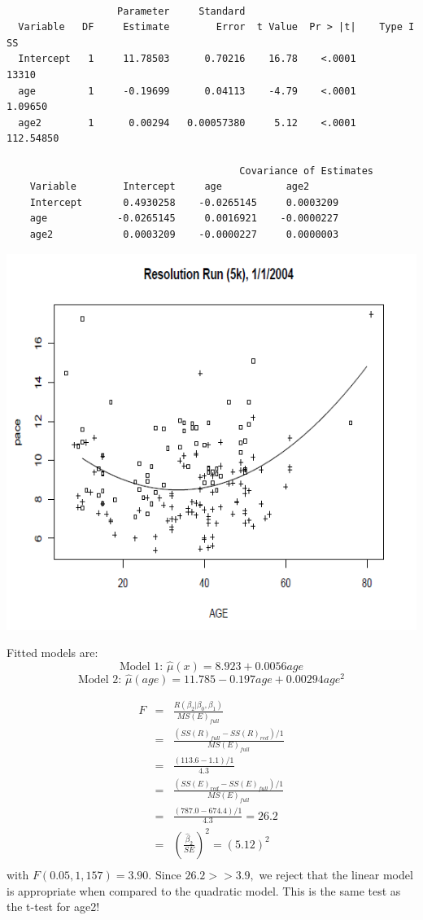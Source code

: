 \newpage

\begin{large}
\begin{verbatim}

                   Parameter     Standard
  Variable   DF     Estimate        Error  t Value  Pr > |t|    Type I SS
  Intercept   1     11.78503      0.70216    16.78    <.0001        13310
  age         1     -0.19699      0.04113    -4.79    <.0001      1.09650
  age2        1      0.00294   0.00057380     5.12    <.0001    112.54850

										Covariance of Estimates 
	Variable        Intercept     age           age2 
	Intercept       0.4930258    -0.0265145     0.0003209 
	age            -0.0265145     0.0016921    -0.0000227 
	age2            0.0003209    -0.0000227     0.0000003 

\end{verbatim}
\end{large}

\begin{center}
\includegraphics[scale=0.5]{res5k_quadratic}
\end{center}
Fitted models are:
$$\text{Model 1: } \hat\mu(x)=8.923 + 0.0056 age$$
$$\text{Model 2: } \hat\mu(age) = 11.785 - 0.197 age + 0.00294 age^2$$

\begin{eqnarray*}
F & = & \frac{R(\beta_2|\beta_0,\beta_1)}{MS(E)_{full}} \\
  & = & \frac{(SS(R)_{full}-SS(R)_{red})/1}{MS(E)_{full}} \\
  & = & \frac{(113.6-1.1)/1}{4.3} \\
  & = & \frac{(SS(E)_{red}-SS(E)_{full})/1}{MS(E)_{full}} \\
  & = & \frac{(787.0-674.4)/1}{4.3} = 26.2 \\
  & = & \left(\frac{\hat\beta_{ 2}}{SE}\right)^2 = (5.12)^2\\
\end{eqnarray*}
with $F(0.05,1,157)=3.90$.  Since $26.2 > > 3.9,$ we reject that the linear model is appropriate when compared to the quadratic model.  This is the same test as the t-test for age2!

